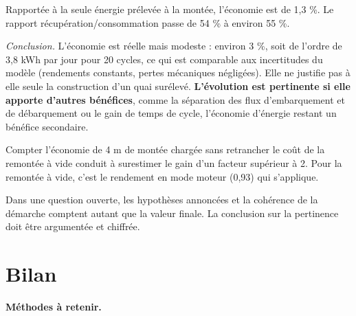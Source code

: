 \documentclass[11pt,a4paper]{article}
\begin{document}
Rapportée à la seule énergie prélevée à la montée, l'économie est de 1,3 \%. Le rapport récupération/consommation passe de 54 \% à environ 55 \%.

\emph{Conclusion.} L'économie est réelle mais modeste : environ 3 \%, soit de l'ordre de 3,8 kWh par jour pour 20 cycles, ce qui est comparable aux incertitudes du modèle (rendements constants, pertes mécaniques négligées). Elle ne justifie pas à elle seule la construction d'un quai surélevé. \textbf{L'évolution est pertinente si elle apporte d'autres bénéfices}, comme la séparation des flux d'embarquement et de débarquement ou le gain de temps de cycle, l'économie d'énergie restant un bénéfice secondaire.

\begin{piege}

Compter l'économie de 4 m de montée chargée sans retrancher le coût de la remontée à vide conduit à surestimer le gain d'un facteur supérieur à 2. Pour la remontée à vide, c'est le rendement en mode moteur (0,93) qui s'applique.

\end{piege}

\begin{jury}

Dans une question ouverte, les hypothèses annoncées et la cohérence de la démarche comptent autant que la valeur finale. La conclusion sur la pertinence doit être argumentée et chiffrée.

\end{jury}

\hypertarget{bilan}{%
\section{Bilan}\label{bilan}}

\textbf{Méthodes à retenir.}
\end{document}
